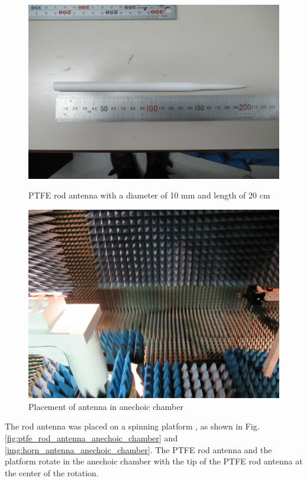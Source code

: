 \documentclass[a4paper,12pt]{report}
\begin{document}
\begin{figure}
  \centering
  \begin{minipage}{0.45\textwidth}
    \centering
    \includegraphics[clip, keepaspectratio, width=0.9\linewidth]{img/ptfe_rod_antenna_20cm.jpg}
    \caption{PTFE rod antenna with a diameter of 10 mm and length of 20 cm}
    \label{fig:ptfe_rod_antenna_20cm} 
  \end{minipage}\hfill
  \begin{minipage}{0.45\textwidth}
    \centering
    \includegraphics[clip, keepaspectratio, width=0.9\linewidth]{img/anechoic_chamber_120_centimeters.jpg}
    \caption{Placement of antenna in anechoic chamber}
    \label{img:anechoic_chamber_120_centimeters}
  \end{minipage}\hfill
\end{figure}

The rod antenna was placed on a spinning platform ,
as shown in Fig. \ref{fig:ptfe_rod_antenna_anechoic_chamber}
and \ref{img:horn_antenna_anechoic_chamber}.
The PTFE rod antenna and the platform rotate in the anechoic chamber
with the tip of the PTFE rod antenna at the center of the rotation.
\end{document}
